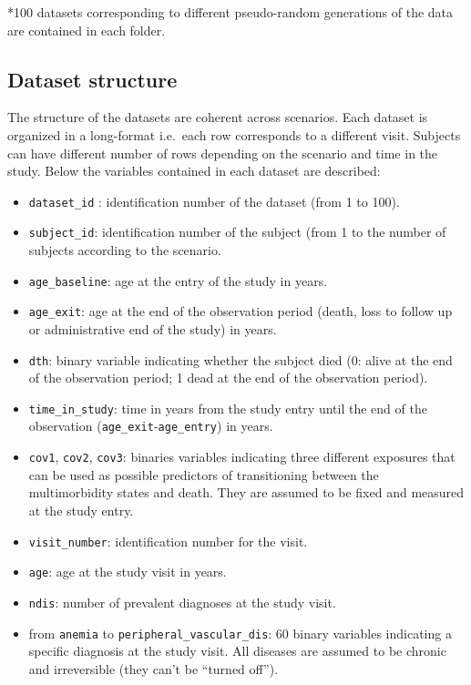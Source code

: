 \documentclass[
]{article}
\begin{document}
*100 datasets corresponding to different pseudo-random generations of
the data are contained in each folder.

\hypertarget{dataset-structure}{%
\subsection{Dataset structure}\label{dataset-structure}}

The structure of the datasets are coherent across scenarios. Each
dataset is organized in a long-format i.e.~each row corresponds to a
different visit. Subjects can have different number of rows depending on
the scenario and time in the study. Below the variables contained in
each dataset are described:

\begin{itemize}
\item
  \texttt{dataset\_id} : identification number of the dataset (from 1 to
  100).
\item
  \texttt{subject\_id}: identification number of the subject (from 1 to
  the number of subjects according to the scenario.
\item
  \texttt{age\_baseline}: age at the entry of the study in years.
\item
  \texttt{age\_exit}: age at the end of the observation period (death,
  loss to follow up or administrative end of the study) in years.
\item
  \texttt{dth}: binary variable indicating whether the subject died (0:
  alive at the end of the observation period; 1 dead at the end of the
  observation period).
\item
  \texttt{time\_in\_study}: time in years from the study entry until the
  end of the observation (\texttt{age\_exit}-\texttt{age\_entry}) in
  years.
\item
  \texttt{cov1}, \texttt{cov2}, \texttt{cov3}: binaries variables
  indicating three different exposures that can be used as possible
  predictors of transitioning between the multimorbidity states and
  death. They are assumed to be fixed and measured at the study entry.
\item
  \texttt{visit\_number}: identification number for the visit.
\item
  \texttt{age}: age at the study visit in years.
\item
  \texttt{ndis}: number of prevalent diagnoses at the study visit.
\item
  from \texttt{anemia} to \texttt{peripheral\_vascular\_dis}: 60 binary
  variables indicating a specific diagnosis at the study visit. All
  diseases are assumed to be chronic and irreversible (they can't be
  ``turned off'').
\end{itemize}
\end{document}
